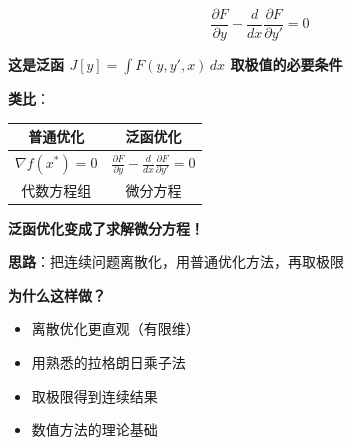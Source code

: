 \documentclass[12pt, a4paper]{ctexart}
\begin{document}
\begin{blackboard}

\begin{keypoint}
\[
\boxed{\frac{\partial F}{\partial y} - \frac{d}{dx}\frac{\partial F}{\partial y'} = 0}
\]
\end{keypoint}

\textbf{这是泛函 $J[y] = \int F(y, y', x) \, dx$ 取极值的必要条件}

\textbf{类比}：
\begin{center}
\begin{tabular}{c|c}
普通优化 & 泛函优化 \\
\hline
$\nabla f(x^*) = 0$ & $\frac{\partial F}{\partial y} - \frac{d}{dx}\frac{\partial F}{\partial y'} = 0$ \\
代数方程组 & 微分方程
\end{tabular}
\end{center}

\textbf{泛函优化变成了求解微分方程！}

\end{blackboard}

\begin{blackboard}

\textbf{思路}：把连续问题离散化，用普通优化方法，再取极限

\textbf{为什么这样做？}
\begin{itemize}
    \item 离散优化更直观（有限维）
    \item 用熟悉的拉格朗日乘子法
    \item 取极限得到连续结果
    \item 数值方法的理论基础
\end{itemize}

\end{blackboard}
\end{document}
